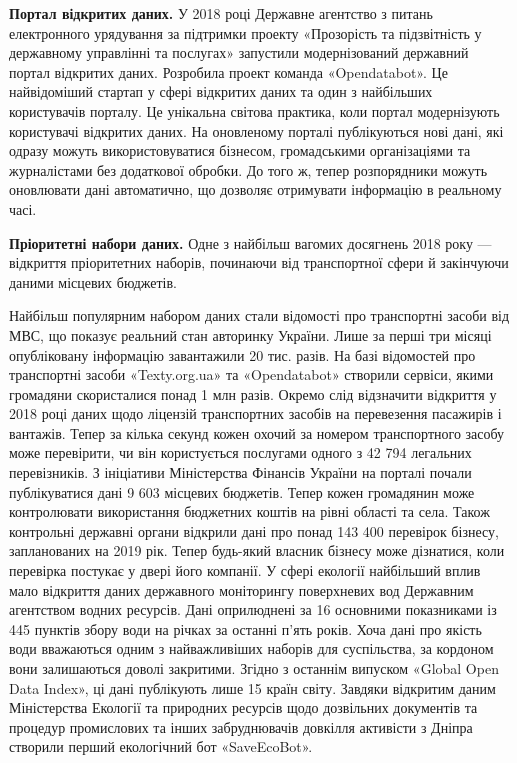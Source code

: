\textbf{Портал відкритих даних.}
У 2018 році Державне агентство з питань електронного урядування за підтримки проекту «Прозорість та підзвітність у державному управлінні та послугах» запустили модернізований державний портал відкритих даних.
Розробила проект команда «Opendatabot». Це найвідоміший стартап у сфері відкритих даних та один з найбільших користувачів порталу. Це унікальна світова практика, коли портал модернізують користувачі відкритих даних.
На оновленому порталі публікуються нові дані, які одразу можуть використовуватися бізнесом, громадськими організаціями та журналістами без додаткової обробки.
До того ж, тепер розпорядники можуть оновлювати дані автоматично, що дозволяє отримувати інформацію в реальному часі.

\textbf{Пріоритетні набори даних.}
Одне з найбільш вагомих досягнень 2018 року — відкриття пріоритетних наборів,
починаючи від транспортної сфери й закінчуючи даними місцевих бюджетів.

Найбільш популярним набором даних стали відомості про транспортні засоби від МВС, що показує реальний стан авторинку України.
Лише за перші три місяці опубліковану інформацію завантажили 20 тис. разів.
На базі відомостей про транспортні засоби «Texty.org.ua» та «Opendatabot» створили сервіси,
якими громадяни скористалися понад 1 млн разів.
Окремо слід відзначити відкриття у 2018 році даних щодо ліцензій транспортних засобів
на перевезення пасажирів і вантажів. Тепер за кілька секунд кожен охочий за номером
транспортного засобу може перевірити, чи він користується послугами одного з 42 794 легальних перевізників.
З ініціативи Міністерства Фінансів України на порталі почали публікуватися дані 9 603 місцевих бюджетів.
Тепер кожен громадянин може контролювати використання бюджетних коштів на рівні області та села.
Також контрольні державні органи відкрили дані про понад 143 400 перевірок бізнесу,
запланованих на 2019 рік. Тепер будь-який власник бізнесу може дізнатися,
коли перевірка постукає у двері його компанії.
У сфері екології найбільший вплив мало відкриття даних державного моніторингу поверхневих вод
Державним агентством водних ресурсів.
Дані оприлюднені за 16 основними показниками із 445 пунктів збору води на річках за останні п'ять років.
Хоча дані про якість води вважаються одним з найважливіших наборів для суспільства,
за кордоном вони залишаються доволі закритими.
Згідно з останнім випуском «Global Open Data Index», ці дані публікують лише 15 країн світу.
Завдяки відкритим даним Міністерства Екології та природних ресурсів щодо дозвільних документів
та процедур промислових та інших забруднювачів довкілля активісти з Дніпра створили перший екологічний бот «SaveEcoBot».

